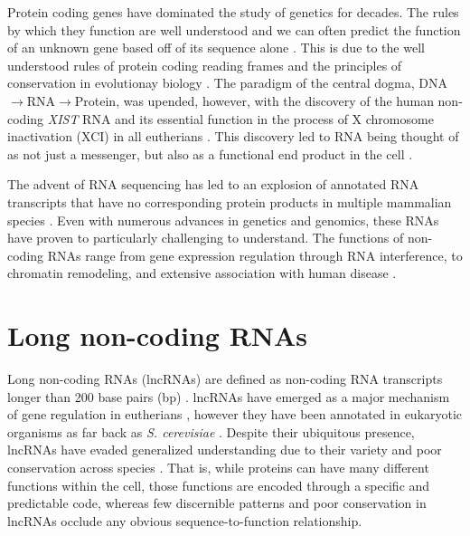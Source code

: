 Protein coding genes have dominated the study of genetics for decades. The rules by which they function are well understood and we can often predict the function of an unknown gene based off of its sequence alone \cite{Whisstock2003PredictionStructure}. This is due to the well understood rules of protein coding reading frames and the principles of conservation in evolutionay biology \cite{Burge1997PredictionDNA,Altschul1990BasicTool,Wheeler2013Nhmmer:HMMs}. The paradigm of the central dogma, DNA $\rightarrow$RNA$\rightarrow$Protein, was upended, however, with the discovery of the human non-coding \emph{XIST} RNA  and its essential function in the process of X chromosome inactivation (XCI) in all eutherians \cite{Brown10TheNucleus.,Brockdorff10TheNucleus.}. This discovery led to RNA being thought of as not just a messenger, but also as a functional end product in the cell \cite{Rinn2012GenomeRNAs,Lee2003TheProcessing,Yang2013MALAT-1Regulation,Tripathi2010ThePhosphorylation,Raphael2017IntegratedAdenocarcinoma,Brown10TheNucleus.,Brockdorff10TheNucleus.}. 

The advent of RNA sequencing has led to an explosion of annotated RNA transcripts that have no corresponding protein products in multiple mammalian species \cite{Derrien2012TheExpression,Hon2017AnEnds,Bogu2016ChromatinMouse}. Even with numerous advances in genetics and genomics, these RNAs have proven to particularly challenging to understand. The functions of non-coding RNAs range from gene expression regulation through RNA interference, to chromatin remodeling, and extensive association with human disease \cite{Rinn2012GenomeRNAs,Lee2003TheProcessing,Yang2013MALAT-1Regulation,Tripathi2010ThePhosphorylation,Raphael2017IntegratedAdenocarcinoma,}.
\section{Long non-coding RNAs}
Long non-coding RNAs (lncRNAs) are defined as non-coding RNA transcripts longer than 200 base pairs (bp) \cite{Derrien2012TheExpression}. lncRNAs have emerged as a major mechanism of gene regulation in eutherians \cite{Sarropoulos2019DevelopmentalSpecies,Bogu2016ChromatinMouse,Sauvageau2013MultipleDevelopment}, however they have been annotated in eukaryotic organisms as far back as \emph{S. cerevisiae} \cite{Niederer2017LongCerevisiae}. Despite their ubiquitous presence, lncRNAs have evaded generalized understanding due to their variety and poor conservation across species \cite{Johnsson2014EvolutionaryFunction}. That is, while proteins can have many different functions within the cell, those functions are encoded through a specific and predictable code, whereas few discernible patterns and poor conservation in lncRNAs occlude any obvious sequence-to-function relationship.



